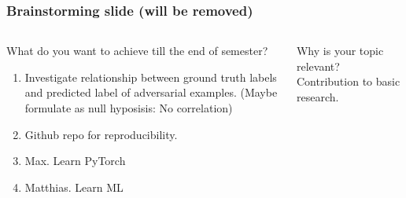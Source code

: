 \documentclass[10pt,usepdftitle=false,aspectratio=169]{beamer}
\begin{document}
\begin{frame}[fragile]
	\frametitle{Brainstorming slide (will be removed)}
	\begin{columns}
		\begin{column}{.5\columnwidth}
			\begin{alertblock}{What do you want to achieve till the end of semester?}
				\begin{enumerate}
					\item Investigate relationship between ground truth labels and predicted label of adversarial examples. (Maybe formulate as null hyposisis: No correlation)
					\item Github repo for reproducibility.
					\item Max. Learn PyTorch
					\item Matthias. Learn ML  
				\end{enumerate}
			\end{alertblock}
		\end{column}
		\begin{column}{.5\columnwidth}
			\begin{block}{Why is your topic relevant?}
				Contribution to basic research. 
			\end{block}
		\end{column}
	\end{columns}
\end{frame}
\end{document}
